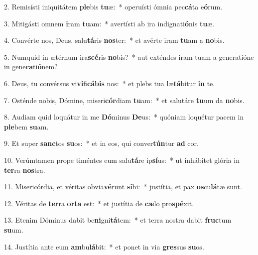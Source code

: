 2. Remisísti iniquitátem \textbf{ple}bis \textbf{tu}æ:~*  operuísti ómnia pec\textbf{cá}ta e\textbf{ó}rum.\

3. Mitigásti omnem \textbf{i}ram \textbf{tu}am:~*  avertísti ab ira indignati\textbf{ó}nis \textbf{tu}æ.\

4. Convérte nos, Deus, salu\textbf{tá}ris \textbf{nos}ter:~*  et avérte iram \textbf{tu}am a \textbf{no}bis.\

5. Numquid in ætérnum ira\textbf{scé}ris \textbf{no}bis?~*  aut exténdes iram tuam a generatióne in gene\textbf{ra}ti\textbf{ó}nem?\

6. Deus, tu convérsus vi\textbf{vi}fi\textbf{cá}\textbf{bis} nos:~*  et plebs tua læ\textbf{tá}bitur \textbf{in} te.\

7. Osténde nobis, Dómine, miseri\textbf{cór}diam \textbf{tu}am:~*  et salutáre \textbf{tu}um da \textbf{no}bis.\

8. Audiam quid loquátur in me \textbf{Dó}minus \textbf{De}us:~*  quóniam loquétur pacem in \textbf{ple}bem \textbf{su}am.\

9. Et super \textbf{sanc}tos \textbf{su}os:~*  et in eos, qui conver\textbf{tún}tur \textbf{ad} cor.\

10. Verúmtamen prope timéntes eum salu\textbf{tá}re ip\textbf{sí}us:~*  ut inhábitet glória in \textbf{ter}ra \textbf{nos}tra.\

11. Misericórdia, et véritas obvia\textbf{vé}runt \textbf{si}bi:~*  justítia, et pax \textbf{os}cu\textbf{lá}tæ sunt.\

12. Véritas de \textbf{ter}ra \textbf{or}\textbf{ta} est:~*  et justítia de \textbf{cæ}lo pro\textbf{spé}xit.\

13. Etenim Dóminus dabit be\textbf{ni}gni\textbf{tá}tem:~*  et terra nostra dabit \textbf{fruc}tum \textbf{su}um.\

14. Justítia ante eum \textbf{am}bu\textbf{lá}bit:~*  et ponet in via \textbf{gres}sus \textbf{su}os.\

